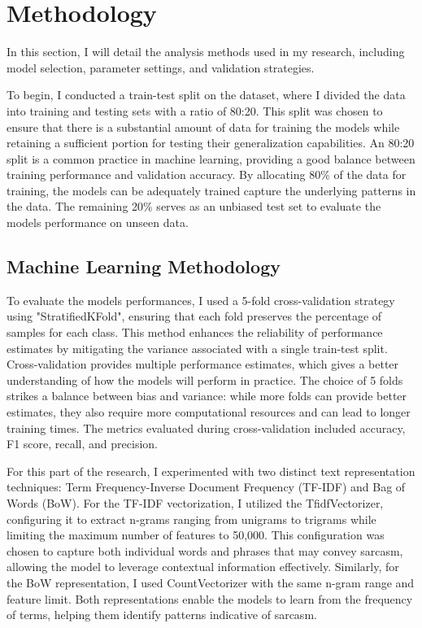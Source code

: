 \section{Methodology}

In this section, I will detail the analysis methods used in my research, including model selection, parameter settings, and validation strategies.

To begin, I conducted a train-test split on the dataset, where I divided the data into training and testing sets with a ratio of 80:20. 
This split was chosen to ensure that there is a substantial amount of data for training the models while retaining a sufficient portion for testing their generalization capabilities. 
An 80:20 split is a common practice in machine learning, providing a good balance between training performance and validation accuracy. By allocating 80\% of the data for training, 
the models can be adequately trained capture the underlying patterns in the data. The remaining 20\% serves as an unbiased test set to evaluate the models performance on unseen data.

\subsection{Machine Learning Methodology}

To evaluate the models performances, I used a 5-fold cross-validation strategy using "StratifiedKFold", ensuring that each fold preserves the percentage of samples for each class. 
This method enhances the reliability of performance estimates by mitigating the variance associated with a single train-test split. Cross-validation provides multiple performance 
estimates, which gives a better understanding of how the models will perform in practice. The choice of 5 folds strikes a balance between bias and variance: while more folds can 
provide better estimates, they also require more computational resources and can lead to longer training times. The metrics evaluated during cross-validation included accuracy, 
F1 score, recall, and precision.

For this part of the research, I experimented with two distinct text representation techniques: Term Frequency-Inverse Document Frequency (TF-IDF) and Bag of Words (BoW). 
For the TF-IDF vectorization, I utilized the TfidfVectorizer, configuring it to extract n-grams ranging from unigrams to trigrams while limiting the maximum number of features to 50,000. 
This configuration was chosen to capture both individual words and phrases that may convey sarcasm, allowing the model to leverage contextual information effectively. 
Similarly, for the BoW representation, I used CountVectorizer with the same n-gram range and feature limit. Both representations enable the models to learn from the frequency of terms, 
helping them identify patterns indicative of sarcasm.


